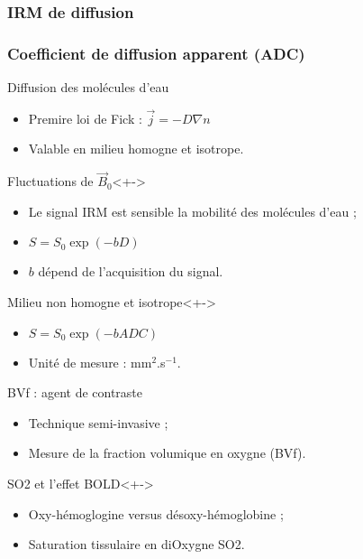 \subsubsection{IRM de diffusion}
\begin{frame}
\frametitle{Coefficient de diffusion apparent (ADC)}
\begin{block}{Diffusion des mol\'ecules d'eau}
\begin{itemize}
\item<+-> Premire loi de Fick : $\vec{j}=-D\nabla n$
\item<+-> Valable en milieu homogne et isotrope.
\end{itemize}
\end{block}

\begin{block}{Fluctuations de $\vec{B}_0$}<+->
\begin{itemize}
\item<+-> Le signal IRM est sensible  la mobilit\'e des mol\'ecules d'eau ;
\item<+-> $S=S_0\exp\left(-bD\right)$
\item<+-> $b$ d\'epend de l'acquisition du signal.
\end{itemize}
\end{block}

\begin{block}{Milieu non homogne et isotrope}<+->
\begin{itemize}
\item<+-> $S=S_0\exp\left(-bADC\right)$
\item<+-> Unit\'e de mesure : mm${}^2$.s${}^{-1}$.
\end{itemize}
\end{block}
\end{frame}

\begin{frame}
\begin{block}{BVf : agent de contraste}
\begin{itemize}
\item<+-> Technique semi-invasive ;
\item<+-> Mesure de la fraction volumique en oxygne (BVf).
\end{itemize}
\end{block}

\begin{block}{SO2 et l'effet BOLD}<+->
\begin{itemize}
\item<+-> Oxy-h\'emoglogine versus d\'esoxy-h\'emoglobine ;
\item<+-> Saturation tissulaire en diOxygne SO2.
\end{itemize}
\end{block}
\end{frame}

